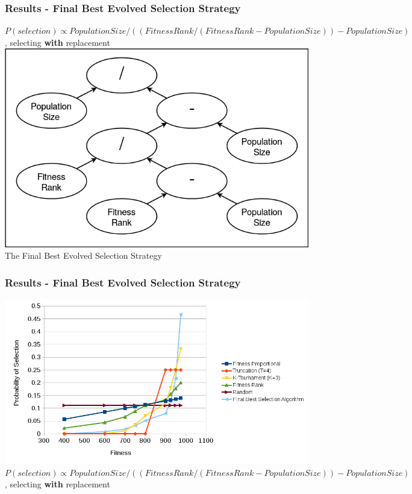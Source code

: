 \documentclass{beamer}
\begin{document}
	\begin{frame}
		\frametitle{Results - Final Best Evolved Selection Strategy}
		\begin{center}
			$P(selection) \propto PopulationSize / ((FitnessRank/(FitnessRank-PopulationSize))-PopulationSize)$, selecting \textbf{with} replacement
			\includegraphics[height=0.60\paperheight]{adpsea_final_no_replacement_bit}		
			\\
			The Final Best Evolved Selection Strategy
		\end{center}
	\end{frame}
	
	\begin{frame}
		\frametitle{Results - Final Best Evolved Selection Strategy}
		\begin{center}
			\includegraphics[width=\textwidth]{selection_chances_with_final}\\
			$P(selection) \propto PopulationSize / ((FitnessRank/(FitnessRank-PopulationSize))-PopulationSize)$, selecting \textbf{with} replacement
		\end{center}
	\end{frame}	
	
\end{document}
